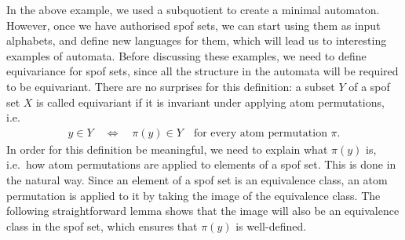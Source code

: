 
In the above example, we used a subquotient to create a minimal automaton. However, once we have authorised spof sets, we can start using them as input alphabets, and define new languages for them, which will lead us to interesting examples of automata. Before discussing these examples, we need to define equivariance for spof sets, since all the structure in the automata will be required to be equivariant. There are no surprises for this definition: a subset $Y$ of a spof set $X$ is called equivariant if it is invariant under applying atom permutations, i.e.
\begin{align*}
y \in Y 
\quad \Leftrightarrow \quad
\pi(y) \in Y 
\quad \text{for every atom permutation $\pi$}.
\end{align*}
In order for this definition be meaningful, we need to explain what $\pi(y)$ is, i.e.~how atom permutations are applied to elements of a spof set.  This is done in the natural way. Since an element of a spof set is an equivalence class, an atom permutation is applied to it by taking the image of the equivalence class. The following straightforward lemma shows that the image will also be an equivalence class in the spof set, which ensures that $\pi(y)$ is well-defined. 


